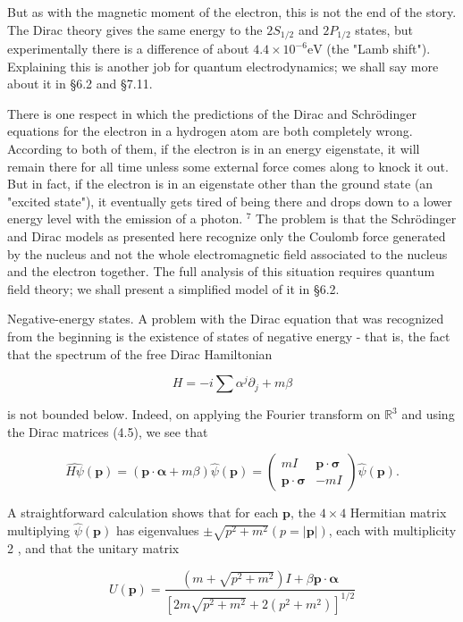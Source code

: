 \documentclass[10pt, letterpaper]{article}
\begin{document}
But as with the magnetic moment of the electron, this is not the end of the story. The Dirac theory gives the same energy to the $2 S_{1 / 2}$ and $2 P_{1 / 2}$ states, but experimentally there is a difference of about $4.4 \times 10^{-6} \mathrm{eV}$ (the "Lamb shift"). Explaining this is another job for quantum electrodynamics; we shall say more about it in §6.2 and §7.11.

There is one respect in which the predictions of the Dirac and Schrödinger equations for the electron in a hydrogen atom are both completely wrong. According to both of them, if the electron is in an energy eigenstate, it will remain there for all time unless some external force comes along to knock it out. But in fact, if the electron is in an eigenstate other than the ground state (an "excited state"), it eventually gets tired of being there and drops down to a lower energy level with the emission of a photon. ${ }^{7}$ The problem is that the Schrödinger and Dirac models as presented here recognize only the Coulomb force generated by the nucleus and not the whole electromagnetic field associated to the nucleus and the electron together. The full analysis of this situation requires quantum field theory; we shall present a simplified model of it in §6.2.

Negative-energy states. A problem with the Dirac equation that was recognized from the beginning is the existence of states of negative energy - that is, the fact that the spectrum of the free Dirac Hamiltonian

$$
H=-i \sum \alpha^{j} \partial_{j}+m \beta
$$

is not bounded below. Indeed, on applying the Fourier transform on $\mathbb{R}^{3}$ and using the Dirac matrices (4.5), we see that

$$
\widehat{H \psi}(\mathbf{p})=(\mathbf{p} \cdot \boldsymbol{\alpha}+m \beta) \widehat{\psi}(\mathbf{p})=\left(\begin{array}{cc}
m I & \mathbf{p} \cdot \boldsymbol{\sigma} \\
\mathbf{p} \cdot \boldsymbol{\sigma} & -m I
\end{array}\right) \widehat{\psi}(\mathbf{p}) .
$$

A straightforward calculation shows that for each $\mathbf{p}$, the $4 \times 4$ Hermitian matrix multiplying $\widehat{\psi}(\mathbf{p})$ has eigenvalues $\pm \sqrt{p^{2}+m^{2}}(p=|\mathbf{p}|)$, each with multiplicity 2 , and that the unitary matrix

$$
U(\mathbf{p})=\frac{\left(m+\sqrt{p^{2}+m^{2}}\right) I+\beta \mathbf{p} \cdot \boldsymbol{\alpha}}{\left[2 m \sqrt{p^{2}+m^{2}}+2\left(p^{2}+m^{2}\right)\right]^{1 / 2}}
$$
\end{document}
